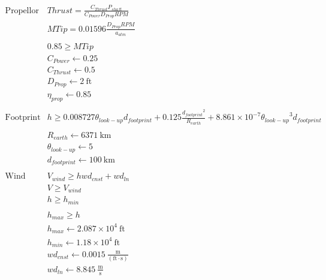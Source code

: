 \documentclass[10pt, a4paper]{article}
\begin{document}
\[ \begin{array}{ll} 
\text{Propellor Model}
    & {Thrust} = \frac{{C_{Thrust}} {P_{shaft}}}{{C_{Power}} {D_{Prop}} {RPM}} \\
    & {MTip} = 0.01596\frac{{D_{Prop}} {RPM}}{{a_{atm}}} \\
    \text{} \\
    & 0.85 \geq {MTip} \\
    & {C_{Power}} \gets 0.25 \\
    & {C_{Thrust}} \gets 0.5 \\
    & {D_{Prop}} \gets 2~\mathrm{ft} \\
    & {\eta_{prop}} \gets 0.85 \\
\text{} \\
\text{Footprint Model}
    & {h} \geq 0.008727{\theta_{look-up}} {d_{footprint}} + 0.125\frac{{d_{footprint}}^{2}}{{R_{earth}}} + 8.861 \times 10^{-7}{\theta_{look-up}}^{3} {d_{footprint}} \\
    \text{} \\
    & {R_{earth}} \gets 6371~\mathrm{km} \\
    & {\theta_{look-up}} \gets 5 \\
    & {d_{footprint}} \gets 100~\mathrm{km} \\
\text{} \\
\text{Wind Velocity Model}
    & {V_{wind}} \geq {h} {wd_{cnst}} + {wd_{ln}} \\
    & {V} \geq {V_{wind}} \\
    & {h} \geq {h_{min}} \\
    \text{} \\
    & {h_{max}} \geq {h} \\
    & {h_{max}} \gets 2.087 \times 10^{4}~\mathrm{ft} \\
    & {h_{min}} \gets 1.18 \times 10^{4}~\mathrm{ft} \\
    & {wd_{cnst}} \gets 0.0015~\mathrm{\tfrac{m}{\left(ft\cdot s\right)}} \\
    & {wd_{ln}} \gets 8.845~\mathrm{\tfrac{m}{s}} \\
\end{array} \]
    
\end{document}
